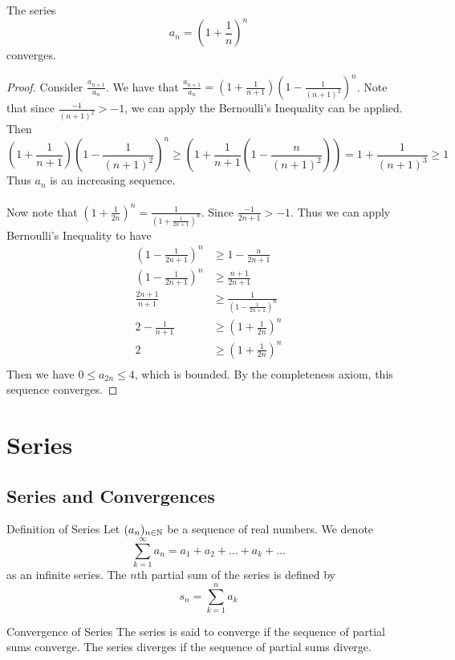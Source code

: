 \documentclass[a4paper]{article}
\begin{document}
\begin{crl}{}{} The series $$a_n=\left(1+\frac{1}{n}\right)^n$$ converges. \tcbline
\begin{proof} Consider $\frac{a_{n+1}}{a_n}$. We have that $\frac{a_{n+1}}{a_n}=\left(1+\frac{1}{n+1}\right)\left(1-\frac{1}{(n+1)^2}\right)^n$. Note that since $\frac{-1}{(n+1)^2}>-1$, we can apply the Bernoulli's Inequality can be applied. Then $$\left(1+\frac{1}{n+1}\right)\left(1-\frac{1}{(n+1)^2}\right)^n\geq\left(1+\frac{1}{n+1}\left(1-\frac{n}{(n+1)^2}\right)\right)=1+\frac{1}{(n+1)^3}\geq 1$$ Thus $a_n$ is an increasing sequence. 
\\~\\ Now note that $\left(1+\frac{1}{2n}\right)^n=\frac{1}{\left(1+\frac{1}{2n+1}\right)^n}$. Since $\frac{-1}{2n+1}>-1$. Thus we can apply Bernoulli's Inequality to have 
\begin{align*}
\left(1-\frac{1}{2n+1}\right)^n&\geq1-\frac{n}{2n+1} \\
\left(1-\frac{1}{2n+1}\right)^n&\geq\frac{n+1}{2n+1} \\
\frac{2n+1}{n+1}&\geq\frac{1}{\left(1-\frac{1}{2n+1}\right)^n} \\
2-\frac{1}{n+1}&\geq\left(1+\frac{1}{2n}\right)^n \\
2&\geq\left(1+\frac{1}{2n}\right)^n \\
\end{align*}
Then we have $0\leq a_{2n}\leq 4$, which is bounded. By the completeness axiom, this sequence converges. 
\end{proof}
\end{crl}

\pagebreak
\section{Series}
\subsection{Series and Convergences}
\begin{defn}{Definition of Series}{} Let $(a_n)_{n\in\mathbb{N}}$ be a sequence of real numbers. We denote $$\sum_{k=1}^{\infty}a_n=a_1+a_2+\dots+a_k+\dots$$ as an infinite series. The $n$th partial sum of the series is defined by $$s_n=\sum_{k=1}^{n}a_k$$
\end{defn} 

\begin{defn}{Convergence of Series}{} The series is said to converge if the sequence of partial sums converge. The series diverges if the sequence of partial sums diverge. 
\end{defn}
\end{document}
